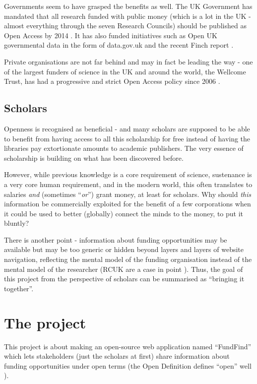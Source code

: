 Governments seem to have grasped the benefits as well. The UK Government has mandated that all research funded with public money (which is a lot in the UK - almost everything through the seven Research Councils) should be published as Open Access by 2014 \cite{guardian-ukgov-oa2014}. It has also funded initiatives such as Open UK governmental data in the form of data.gov.uk \cite{open-uk-gov-data} and the recent Finch report \cite{guardian-finch} \cite{finch}.

Private organisations are not far behind and may in fact be leading the way - one of the largest funders of science in the UK and around the world, the Wellcome Trust, has had a progressive and strict Open Access policy since 2006 \cite{wellcome-oa}.

\subsection{Scholars}
Openness is recognised as beneficial - and many scholars are supposed to be able to benefit from having access to all this scholarship for free instead of having the libraries pay extortionate amounts to academic publishers. The very essence of scholarship is building on what has been discovered before.

However, while previous knowledge is a core requirement of science, sustenance is a very core human requirement, and in the modern world, this often translates to salaries \emph{and} (sometimes ``\emph{or}'') grant money, at least for scholars. Why should \emph{this} information be commercially exploited for the benefit of a few corporations when it could be used to better (globally) connect the minds to the money, to put it bluntly?

There is another point - information about funding opportunities may be available but may be too generic or hidden beyond layers and layers of website navigation, reflecting the mental model of the funding organisation instead of the mental model of the researcher (RCUK are a case in point \cite{rcuk-home}). Thus, the goal of this project from the perspective of scholars can be summarised as ``bringing it together''.

\section{The project}
This project is about making an open-source web application named ``FundFind'' which lets stakeholders (just the scholars at first) share information about funding opportunities under open terms (the Open Definition defines ``open'' well \cite{od}).

